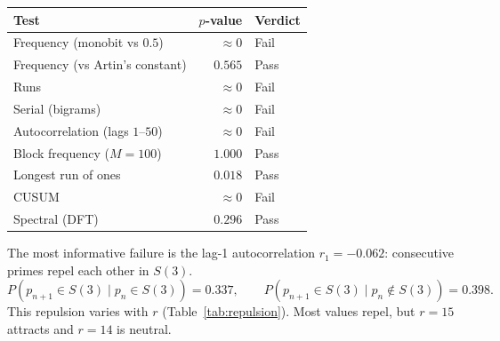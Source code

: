 \documentclass[11pt]{article}
\theoremstyle{definition}
\theoremstyle{remark}
\begin{document}
\begin{center}
\begin{tabular}{lrl}
\toprule
Test & $p$-value & Verdict \\
\midrule
Frequency (monobit vs $0.5$) & $\approx 0$ & Fail \\
Frequency (vs Artin's constant) & $0.565$ & Pass \\
Runs & $\approx 0$ & Fail \\
Serial (bigrams) & $\approx 0$ & Fail \\
Autocorrelation (lags $1$--$50$) & $\approx 0$ & Fail \\
Block frequency ($M=100$) & $1.000$ & Pass \\
Longest run of ones & $0.018$ & Pass \\
CUSUM & $\approx 0$ & Fail \\
Spectral (DFT) & $0.296$ & Pass \\
\bottomrule
\end{tabular}
\end{center}

The most informative failure is the lag-1 autocorrelation
$r_1 = -0.062$: consecutive primes repel each other in $S(3)$.
\[
  P(p_{n+1} \in S(3) \mid p_n \in S(3)) = 0.337,
  \qquad
  P(p_{n+1} \in S(3) \mid p_n \notin S(3)) = 0.398.
\]
This repulsion varies with $r$ (Table~\ref{tab:repulsion}).
Most values repel, but $r = 15$ attracts
and $r = 14$ is neutral.
\end{document}
